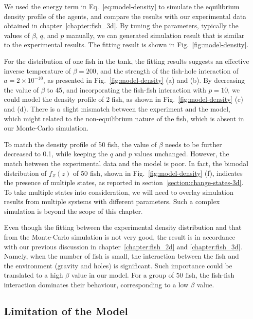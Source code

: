 \documentclass[11pt,twoside]{report}
\begin{document}
We used the energy term in Eq.~\ref{eq:model-density} to simulate the equilibrium density profile of the agents, and compare the results with our experimental data obtained in chapter~\ref{chapter:fish_3d}. By tuning the parameters, typically the values of $\beta$, $q$, and $p$ manually, we can generated simulation result that is similar to the experimental results. The fitting result is shown in Fig.~\ref{fig:model-density}.

For the distribution of one fish in the tank, the fitting results suggests an effective inverse temperature of $\beta = 200$, and the strength of the fish-hole interaction of $a = 2\times 10^{-10}$, as presented in Fig.~\ref{fig:model-density} (a) and (b). By decreasing the value of $\beta$ to 45, and incorporating the fish-fish interaction with $p = 10$, we could model the density profile of 2 fish, as shown in Fig.~\ref{fig:model-density} (c) and (d). There is a slight mismatch between the experiment and the model, which might related to the non-equilibrium nature of the fish, which is absent in our Monte-Carlo simulation.
 
 To match the density profile of 50 fish, the value of $\beta$ needs to be further decreased to 0.1, while keeping the $q$ and $p$ values unchanged. However, the match between the experimental data and the model is poor. In fact, the bimodal distribution of $f_Z(z)$ of 50 fish, shown in Fig.~\ref{fig:model-density} (f), indicates the presence of multiple states, as reported in section~\ref{section:change-states-3d}. To take multiple states into consideration, we will need to overlay simulation results from multiple systems with different parameters. Such a complex simulation is beyond the scope of this chapter.
  
Even though the fitting between the experimental density distribution and that from the Monte-Carlo simulation is not very good, the result is in accordance with our previous discussion in chapter~\ref{chapter:fish_2d} and \ref{chapter:fish_3d}. Namely, when the number of fish is small, the interaction between the fish and the environment (gravity and holes) is significant. Such importance could be translated to a high $\beta$ value in our model. For a group of 50 fish, the fish-fish interaction dominates their behaviour, corresponding to a low $\beta$ value.



\subsection{Limitation of the Model}
\end{document}
